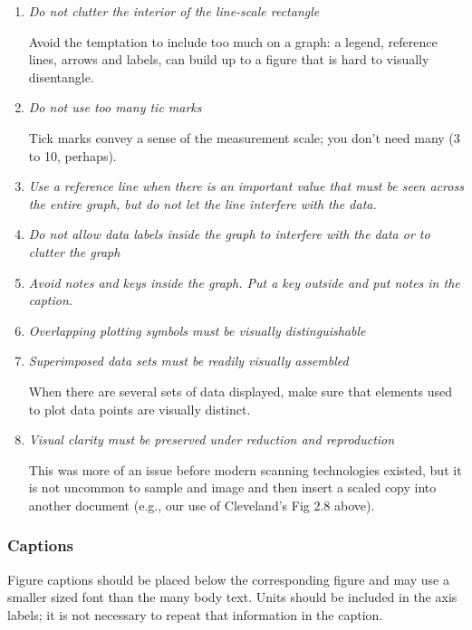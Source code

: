 \begin{enumerate}
\item	\textit{Do not clutter the interior of the line-scale rectangle}

Avoid the temptation to include too much on a graph: a legend, reference lines, arrows and labels, can build up to a figure that is hard to visually disentangle.

\item	\textit{Do not use too many tic marks}

Tick marks convey a sense of the measurement scale; you don’t need many (3 to 10, perhaps).

\item	\textit{Use a reference line when there is an important value that must be seen across the entire graph, but do not let the line interfere with the data.}

\item	\textit{Do not allow data labels inside the graph to interfere with the data or to clutter the graph}

\item	\textit{Avoid notes and keys inside the graph. Put a key outside and put notes in the caption.}

\item	\textit{Overlapping plotting symbols must be visually distinguishable} 

\item	\textit{Superimposed data sets must be readily visually assembled}

When there are several sets of data displayed, make sure that elements used to plot data points are visually distinct.

\item	\textit{Visual clarity must be preserved under reduction and reproduction}

This was more of an issue before modern scanning technologies existed, but it is not uncommon to sample and image and then insert a scaled copy into another document (e.g., our use of Cleveland's Fig 2.8 above).

\end{enumerate}

\subsubsection{Captions}
Figure captions should be placed below the corresponding figure and may use a smaller sized font than the many body text. Units should be included in the axis labels; it is not necessary to repeat that information in the caption.

